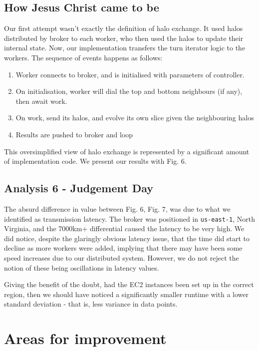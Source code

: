 \documentclass[twoside,twocolumn]{article}
\begin{document}
\subsection{How Jesus Christ came to be}
Our first attempt wasn't exactly the definition of halo exchange. It used halos distributed by broker to
each worker, who then used the halos to update their internal state. Now, our implementation transfers the turn iterator
logic to the workers. The sequence of events happens as follows:
\begin{enumerate}[noitemsep]
  \item Worker connects to broker, and is initialised with parameters of controller.
  \item On initialisation, worker will dial the top and bottom neighbours (if any), then await work.
  \item On work, send its halos, and evolve its own slice given the neighbouring halos
  \item Results are pushed to broker and loop
\end{enumerate}
This oversimplified view of halo exchange is represented by a significant amount of implementation code.
We present our results with Fig. 6.


\subsection{Analysis 6 - Judgement Day}
The absurd difference in value between Fig. 6, Fig. 7, was due to what we identified as transmission latency. The broker
was positioned in \texttt{us-east-1}, North Virginia, and the 7000km+ differential caused the latency 
to be very high.
We did notice, despite the glaringly obvious latency issue, that the time did start to decline as more workers
were added, implying that there may have been some speed increases due to our distributed system. However,
we do not reject the notion of these being oscillations in latency values.

Giving the benefit of the doubt, had the EC2 instances been set up in the correct region, then we should have noticed
a significantly smaller runtime with a lower standard deviation - that is, less variance in data points.



\section{Areas for improvement}
\end{document}
